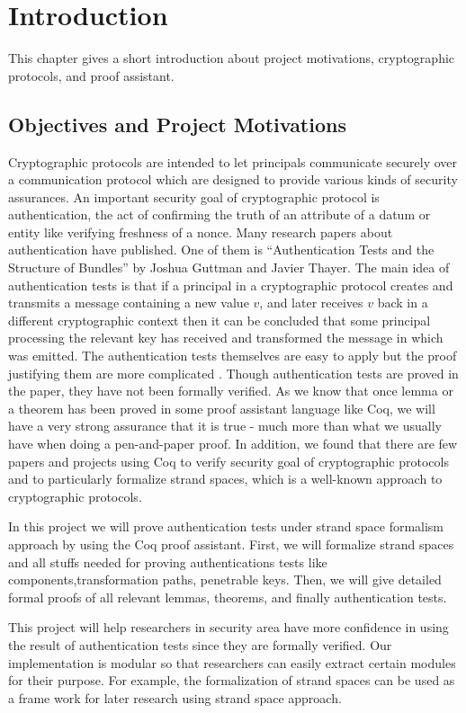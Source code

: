 \chapter{Introduction}
This chapter gives a short introduction about project motivations,
cryptographic protocols, and proof assistant. 
\section{Objectives and Project Motivations}
Cryptographic protocols are intended to let principals communicate
securely over a communication protocol which are designed to provide
various kinds of security assurances. An important security goal of
cryptographic protocol is authentication, the act of confirming the
truth of an attribute of a datum or entity like verifying freshness of
a nonce. Many research papers about authentication have published. One
of them is “Authentication Tests and the Structure of Bundles” by
Joshua Guttman and Javier Thayer. The main idea of authentication
tests is that if a principal in a cryptographic protocol creates and
transmits a message containing a new value $v$, and later receives $v$
back in a different cryptographic context then it can be concluded
that some principal processing the relevant key has received and
transformed the message in which  was emitted. The authentication
tests themselves are easy to apply but the proof justifying them are
more complicated \cite{Guttman}. Though authentication tests are proved in the paper, they have not been formally verified.  As we know that once lemma or a
theorem has been proved in some proof assistant language like Coq, we
will have a very strong assurance that it is true - much more than
what we usually have when doing a pen-and-paper proof. In addition, we found that there are few papers and projects using Coq to verify security goal of cryptographic protocols and to particularly formalize strand spaces, which is a well-known approach to cryptographic protocols.

In this project we will prove authentication tests under strand space formalism approach by using the Coq proof assistant. First, we will formalize strand spaces and all stuffs needed for proving authentications tests like components,transformation paths, penetrable keys. Then, we will give detailed formal proofs of all relevant lemmas, theorems, and finally authentication tests.

This project will help researchers in security area have more
confidence in using the result of authentication tests since they are
formally verified. Our implementation is modular so that researchers
can easily extract certain modules for their purpose. For example, the
formalization of strand spaces can be used as a frame work for later
research using strand space approach.

